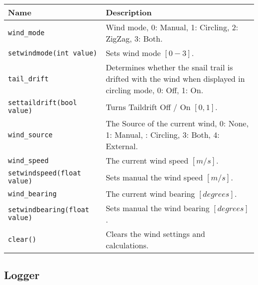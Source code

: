 \begin{maxipage}
\begin{tabularx}{1.9\textwidth}{l|X}
Name & Description \\
\hline\hline

\verb|wind_mode| & Wind mode, 0: Manual, 1: Circling, 2: ZigZag, 3: Both.\\

\hline

\verb|setwindmode(int value)| & Sets wind mode $[0-3]$.\\

\hline

\verb|tail_drift| & Determines whether the snail trail is drifted with the
wind \newline when displayed in circling mode, 0: Off, 1: On. \\

\hline

\verb|settaildrift(bool value)| & Turns Taildrift Off / On $[{0,1}]$.\\

\hline

\verb|wind_source| & The Source of the current wind, 0: None, 1: Manual,
\newline 2: Circling, 3: Both, 4: External.\\

\hline

\verb|wind_speed| & The current wind speed
$[{m/s}]$.\\

\hline

\verb|setwindspeed(float value)| & Sets manual the wind speed $[{m/s}]$.\\

\hline

\verb|wind_bearing| & The current wind bearing
$[{degrees}]$.\\

\hline

\verb|setwindbearing(float value)| & Sets manual the wind bearing $[{degrees}]$.\\

\hline

\verb|clear()| & Clears the wind settings and calculations.\\

\hline

\end{tabularx}
\end{maxipage}

\subsection{Logger}\label{sec:lua.logger}


